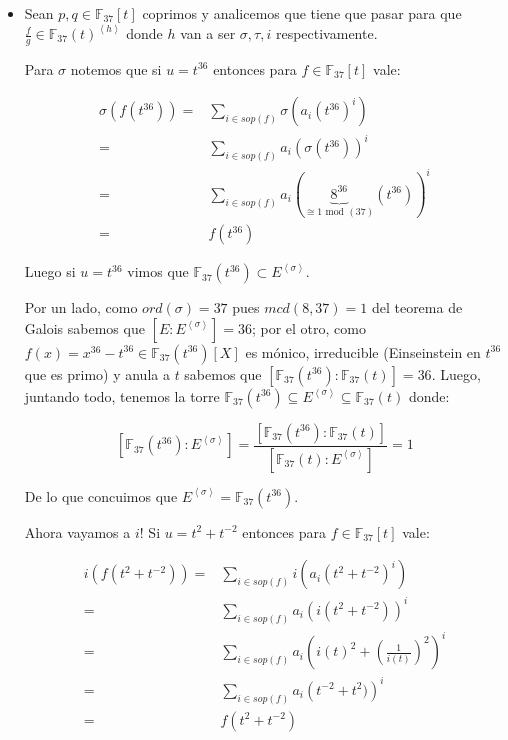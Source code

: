 \documentclass[11pt]{article}
\newcommand{\ip}[1]{\left\langle#1\right\rangle}
\numberwithin{theorem}{subsection}
\begin{document}
\begin{enumerate}
\begin{itemize}
	\item Sean $p,q \in \mathbb{F}_{37}[t]$ coprimos y analicemos que tiene que pasar para que $\frac{f}{g} \in \mathbb{F}_{37}(t)^{\ip{h}}$ donde $h$ van a ser $\sigma, \tau, i$ respectivamente. 
	
	Para $\sigma$ notemos que si $u = t^{36}$ entonces para $f \in \mathbb{F}_{37}[t]$ vale:
	
	\begin{equation*}
		\begin{aligned}
		\sigma\left(f(t^{36})\right) = & \sum\limits_{i \in sop(f)}{\sigma\left(a_i (t^{36})^{i} \right)} \\
		= & \sum\limits_{i \in sop(f)} {a_i \left(\sigma(t^{36})\right)^i} \\
		= & \sum\limits_{i \in sop(f)} {a_i \left(\underbrace{8^{36}}_{\cong 1 \text{ mod }(37)}(t^{36})\right)^i} \\
		=  & f(t^{36})
		\end{aligned}
	\end{equation*}
	
	Luego si $u = t^{36}$ vimos que $\mathbb{F}_{37}(t^{36}) \subset E^{\ip{\sigma}}$. 
	
	Por un lado, como $ord(\sigma) = 37$ pues $mcd(8,37) = 1$ del teorema de Galois sabemos que $\left[E: E^{\ip{\sigma}}\right] = 36$; por el otro, como $f(x) = x^{36} - t^{36} \in \mathbb{F}_{37}(t^{36})[X]$ es m\'onico, irreducible (Einseinstein en $t^{36}$ que es primo) y anula a $t$ sabemos que $\left[\mathbb{F}_{37}(t^{36}): \mathbb{F}_{37}(t)\right] = 36$. Luego, juntando todo, tenemos la torre $\mathbb{F}_{37}(t^{36})  \subseteq E^{\ip{\sigma}} \subseteq \mathbb{F}_{37}(t) $ donde:

	\begin{equation*}
		\left[\mathbb{F}_{37}(t^{36}): E^{\ip{\sigma}}\right] = \dfrac{\left[\mathbb{F}_{37}(t^{36}): \mathbb{F}_{37}(t)\right]}{\left[\mathbb{F}_{37}(t): E^{\ip{\sigma}}\right]} = 1
	\end{equation*}
	
	De lo que concuimos que $E^{\ip{\sigma}} = \mathbb{F}_{37}(t^{36})$.
	
	Ahora vayamos a $i$! Si $u = t^2 + t^{-2}$ entonces para $f \in \mathbb{F}_{37}[t]$ vale:
	
	\begin{equation*}
	\begin{aligned}
	i\left(f(t^2 + t^{-2})\right) = & \sum\limits_{i \in sop(f)}{i\left(a_i (t^2 + t^{-2})^{i} \right)} \\
	= & \sum\limits_{i \in sop(f)} {a_i \left(i(t^2 + t^{-2})\right)^i} \\
	= & \sum\limits_{i \in sop(f)} {a_i \left(i(t)^2 + \left(\frac{1}{i(t)}\right)^{2}\right)^i} \\
	= & \sum\limits_{i \in sop(f)} {a_i \left(t^{-2} + t^{2})\right)^i} \\
	=  & f(t^2 + t^{-2})
	\end{aligned}
	\end{equation*}
	

\end{itemize}
\end{enumerate}
\end{document}
